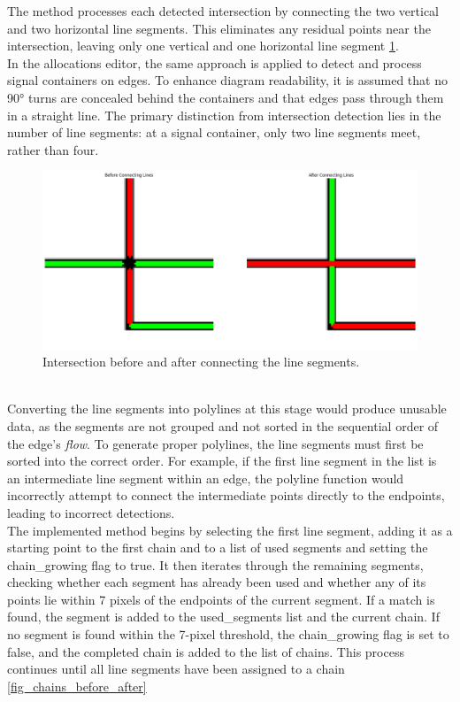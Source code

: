 The method processes each detected intersection by connecting the two vertical and two horizontal line segments. This eliminates any residual points near the intersection, leaving only one vertical and one horizontal line segment \ref{fig:_intersection_before_after}.\\
In the allocations editor, the same approach is applied to detect and process signal containers on edges. To enhance diagram readability, it is assumed that no 90° turns are concealed behind the containers and that edges pass through them in a straight line. The primary distinction from intersection detection lies in the number of line segments: at a signal container, only two line segments meet, rather than four.
\begin{figure}[h]
    \centering
    \includegraphics[width=0.7\linewidth]{Pictures/intersection_before_after.png}
    \caption{Intersection before and after connecting the line segments.}
    \label{fig:_intersection_before_after}
\end{figure}\\
Converting the line segments into polylines at this stage would produce unusable data, as the segments are not grouped and not sorted in the sequential order of the edge's \textit{flow}. To generate proper polylines, the line segments must first be sorted into the correct order. For example, if the first line segment in the list is an intermediate line segment within an edge, the polyline function would incorrectly attempt to connect the intermediate points directly to the endpoints, leading to incorrect detections.\\
The implemented method begins by selecting the first line segment, adding it as a starting point to the first chain and to a list of used segments and setting the chain\_growing flag to true. It then iterates through the remaining segments, checking whether each segment has already been used and whether any of its points lie within 7 pixels of the endpoints of the current segment. If a match is found, the segment is added to the used\_segments list and the current chain. If no segment is found within the 7-pixel threshold, the chain\_growing flag is set to false, and the completed chain is added to the list of chains. This process continues until all line segments have been assigned to a chain \ref{fig_chains_before_after}

